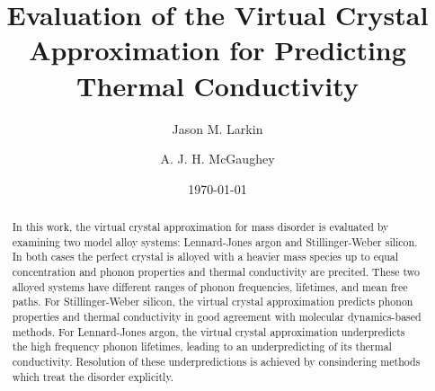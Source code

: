 \documentclass[aps,prb,onecolumn,preprint,superscriptaddress,amsmath,amssymb,floatfix]{revtex4}
\begin{document}

\title{Evaluation of the Virtual Crystal Approximation for Predicting 
Thermal Conductivity}
\author{Jason M. Larkin}
\author{A. J. H. McGaughey}

\date{\today}


\begin{abstract}
In this work, the virtual crystal approximation for mass disorder is 
evaluated by examining two model alloy systems: Lennard-Jones argon 
and Stillinger-Weber silicon. In both cases the perfect crystal is 
alloyed with a heavier mass species up to equal concentration and 
phonon properties and thermal conductivity 
are precited. These 
two alloyed systems have different ranges of phonon frequencies, 
lifetimes, and mean free paths.
For Stillinger-Weber silicon, the 
virtual crystal approximation predicts phonon properties and thermal 
conductivity in good agreement with molecular dynamics-based methods. 
For Lennard-Jones argon, the virtual crystal approximation underpredicts 
the high frequency phonon lifetimes, leading to an underpredicting of 
its thermal conductivity. Resolution of these underpredictions is achieved 
by consindering methods which treat the disorder explicitly. 
\end{abstract}


\maketitle
\clearpage
\end{document}
